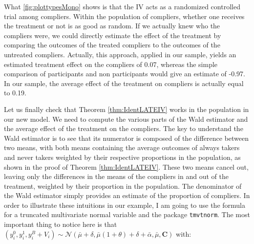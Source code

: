 \documentclass[
]{book}
\theoremstyle{definition}
\theoremstyle{definition}
\theoremstyle{definition}
\theoremstyle{definition}
\theoremstyle{remark}
\begin{document}
What \ref{fig:plottypesMono} shows is that the IV acts as a randomized controlled trial among compliers.
Within the population of compliers, whether one receives the treatment or not is as good as random.
If we actually knew who the compliers were, we could directly estimate the effect of the treatment by comparing the outcomes of the treated compliers to the outcomes of the untreated compliers.
Actually, this approach, applied in our sample, yields an estimated treatment effect on the compliers of 0.07, whereas the simple comparison of participants and non participants would give an estimate of -0.97.
In our sample, the average effect of the treatment on compliers is actually equal to 0.19.

Let us finally check that Theorem \ref{thm:IdentLATEIV} works in the population in our new model.
We need to compute the various parts of the Wald estimator and the average effect of the treatment on the compliers.
The key to understand the Wald estimator is to see that its numerator is composed of the difference between two means, with both means containing the average outcomes of always takers and never takers weighted by their respective proportions in the population, as shown in the proof of Theorem \ref{thm:IdentLATEIV}.
These two means cancel out, leaving only the differences in the means of the compliers in and out of the treatment, weighted by their proportion in the population.
The denominator of the Wald estimator simply provides an estimate of the proportion of compliers.
In order to illustrate these intuitions in our example, I am going to use the formula for a truncated multivariate normal variable and the package \texttt{tmvtnorm}.
The most important thing to notice here is that \((y^0_i,y^1_i,y_i^B+V_i) \sim \mathcal{N}\left(\bar{\mu}+\delta,\bar{\mu}(1+\theta)+\delta+\bar{\alpha},\bar{\mu},\mathbf{C}\right)\) with:
\end{document}
